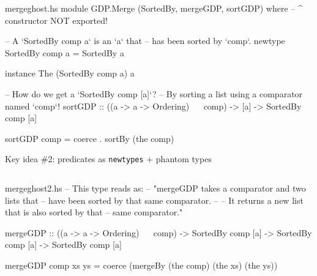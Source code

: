 \documentclass{beamer}
\begin{document}

\begin{filecontents*}{mergeghost.hs}
module GDP.Merge (SortedBy, mergeGDP, sortGDP) where
                  -- ^ constructor NOT exported!

-- A `SortedBy comp a` is an `a` that
-- has been sorted by `comp`.
newtype SortedBy comp a = SortedBy a

instance The (SortedBy comp a) a

-- How do we get a `SortedBy comp [a]`?
-- By sorting a list using a comparator named `comp`!
sortGDP :: ((a -> a -> Ordering) ~~ comp)
        -> [a]
        -> SortedBy comp [a]

sortGDP comp = coerce . sortBy (the comp)
\end{filecontents*}

\begin{frame}{Key idea \#2: predicates as \texttt{newtypes} + phantom types}
\inputminted{haskell}{mergeghost.hs}  
\end{frame}

\begin{filecontents*}{mergeghost2.hs}
-- This type reads as:
-- "mergeGDP takes a comparator and two lists that
-- have been sorted by that same comparator.
--
-- It returns a new list that is also sorted by that
-- same comparator."

mergeGDP :: ((a -> a -> Ordering) ~~ comp)
         -> SortedBy comp [a]
         -> SortedBy comp [a]
         -> SortedBy comp [a]
         
mergeGDP comp xs ys =
    coerce (mergeBy (the comp) (the xs) (the ys))
\end{filecontents*}
\end{document}
